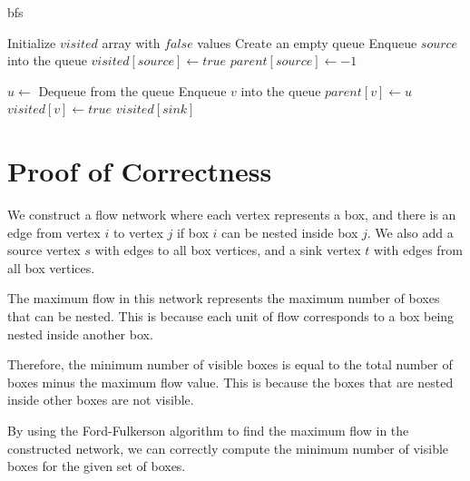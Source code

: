\documentclass{article}
\begin{document}
\begin{algorithm}
\caption{bfs}
\begin{algorithmic}[1]
    \State Initialize $visited$ array with $false$ values
    \State Create an empty queue
    \State Enqueue $source$ into the queue
    \State $visited[source] \gets true$
    \State $parent[source] \gets -1$

        \State $u \gets$ Dequeue from the queue
                \State Enqueue $v$ into the queue
                \State $parent[v] \gets u$
                \State $visited[v] \gets true$
            \EndIf
        \EndFor
    \EndWhile
    \State \Return $visited[sink]$
\EndFunction
\end{algorithmic}
\end{algorithm}


\section{Proof of Correctness}
We construct a flow network where each vertex represents a box, and there is an edge from vertex $i$ to vertex $j$ if box $i$ can be nested inside box $j$. We also add a source vertex $s$ with edges to all box vertices, and a sink vertex $t$ with edges from all box vertices.

The maximum flow in this network represents the maximum number of boxes that can be nested. This is because each unit of flow corresponds to a box being nested inside another box.

Therefore, the minimum number of visible boxes is equal to the total number of boxes minus the maximum flow value. This is because the boxes that are nested inside other boxes are not visible.

By using the Ford-Fulkerson algorithm to find the maximum flow in the constructed network, we can correctly compute the minimum number of visible boxes for the given set of boxes.
\end{document}
